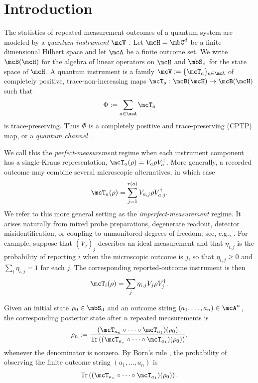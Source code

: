 \documentclass[a4paper]{article}
\numberwithin{equation}{section}   %
\theoremstyle{plain}   %
\theoremstyle{plain}   %
\theoremstyle{examplestyle}
\DeclareMathOperator{\states}{\mbS_d}   %
\newcommand{\adj}{^\dagger}         %
\renewcommand{\tr}[1]{\operatorname{Tr}\left(#1\right)} %
\begin{document}
\section{Introduction}
\label{section:intro}


The statistics of repeated measurement outcomes of a quantum system are modeled by a \emph{quantum instrument} \(\mcV\) \cite{Davies_1970}.
Let \(\mcH=\mbC^d\) be a finite-dimensional Hilbert space and let \(\mcA\) be a finite outcome set.
We write \(\mcB(\mcH)\) for the algebra of linear operators on \(\mcH\) and \(\states\) for the state space of \(\mcH\).
A quantum instrument is a family \(\mcV:=\{\mcT_a\}_{a\in\mcA}\) of completely positive, trace-non-increasing maps \(\mcT_a:\mcB(\mcH)\to\mcB(\mcH)\) such that
\[
    \Phi:=\sum_{a\in\mcA}\mcT_a
\]
is trace-preserving.
Thus \(\Phi\) is a completely positive and trace-preserving (CPTP) map, or a \emph{quantum channel} \cite{Watrous_2018}.

We call this the \emph{perfect-measurement} regime when each instrument component has a single-Kraus representation, \(\mcT_a(\rho)=V_a\rho V_a\adj\).
More generally, a recorded outcome may combine several microscopic alternatives, in which case
\[
    \mcT_a(\rho)=\sum_{j=1}^{r(a)}V_{a,j}\rho V_{a,j}\adj.
\]
We refer to this more general setting as the \emph{imperfect-measurement} regime.
It arises naturally from mixed probe preparations, degenerate readout, detector misidentification, or coupling to unmonitored degrees of freedom; see, e.g., \cite{tristant_2025,somaraju2012design}.
For example, suppose that \((V_j)_j\) describes an ideal measurement and that \(\eta_{i,j}\) is the probability of reporting \(i\) when the microscopic outcome is \(j\), so that \(\eta_{i,j}\ge 0\) and \(\sum_{i}\eta_{i,j} = 1\) for each $j$.
The corresponding reported-outcome instrument is then
\[
    \mcT_i(\rho)=\sum_j\eta_{i,j}V_j\rho V_j\adj.
\]

Given an initial state \(\rho_0\in\states\) and an outcome string \((a_1,\ldots,a_n)\in\mcA^n\), the corresponding posterior state after \(n\) repeated measurements is
%
\begin{equation}
    \rho_n
    :=
    \frac{(\mcT_{a_n}\circ\cdots\circ\mcT_{a_1})(\rho_0)}
         {\tr{(\mcT_{a_n}\circ\cdots\circ\mcT_{a_1})(\rho_0)}},
\end{equation}
%
whenever the denominator is nonzero. By Born's rule \cite{Born1926}, the probability of observing the finite outcome string \((a_1,\ldots,a_n)\) is
%
\begin{equation}
    \tr{(\mcT_{a_n}\circ\cdots\circ\mcT_{a_1})(\rho_0)}.
\end{equation}
\end{document}

